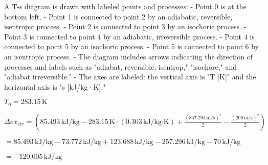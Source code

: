 A T-s diagram is drawn with labeled points and processes:  
- Point 0 is at the bottom left.  
- Point 1 is connected to point 2 by an adiabatic, reversible, isentropic process.  
- Point 2 is connected to point 3 by an isochoric process.  
- Point 3 is connected to point 4 by an adiabatic, irreversible process.  
- Point 4 is connected to point 5 by an isochoric process.  
- Point 5 is connected to point 6 by an isentropic process.  
- The diagram includes arrows indicating the direction of processes and labels such as "adiabat, reversible, isentrop," "isochore," and "adiabat irreversible."  
- The axes are labeled: the vertical axis is "T [K]" and the horizontal axis is "s [kJ/kg·K]."

\( T_0 = 283.15 \, \text{K} \)  

\( \Delta ex_{str} = (85.493 \, \text{kJ/kg} - 283.15 \, \text{K} \cdot (0.303 \, \text{kJ/kg·K}) + \frac{(857.294 \, \text{m/s})^2}{2} - \frac{(200 \, \text{m/s})^2}{2}) \)  

\( = 85.493 \, \text{kJ/kg} - 73.772 \, \text{kJ/kg} + 123.688 \, \text{kJ/kg} - 257.296 \, \text{kJ/kg} - 70 \, \text{kJ/kg} \)  

\( = -120.005 \, \text{kJ/kg} \)